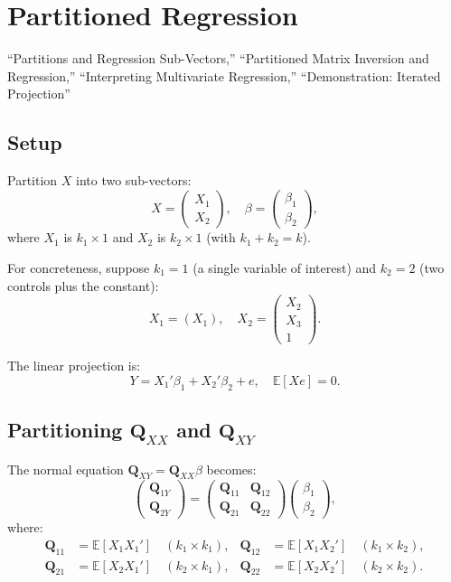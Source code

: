 \documentclass[12pt]{article}
\newcommand{\E}{\mathbb{E}}
\newcommand{\bfQ}{\mathbf{Q}}
\theoremstyle{definition}
\begin{document}
\section{Partitioned Regression}
\label{sec:partitioned}

\begin{tcolorbox}[colback=blue!5, colframe=blue!50, title=Slide Reference]
``Partitions and Regression Sub-Vectors,'' ``Partitioned Matrix Inversion and Regression,'' ``Interpreting Multivariate Regression,'' ``Demonstration: Iterated Projection''
\end{tcolorbox}

\subsection{Setup}

Partition $X$ into two sub-vectors:
\[
X = \begin{pmatrix} X_1 \\ X_2 \end{pmatrix}, \quad
\beta = \begin{pmatrix} \beta_1 \\ \beta_2 \end{pmatrix},
\]
where $X_1$ is $k_1 \times 1$ and $X_2$ is $k_2 \times 1$ (with $k_1 + k_2 = k$).

For concreteness, suppose $k_1 = 1$ (a single variable of interest) and $k_2 = 2$ (two controls plus the constant):
\[
X_1 = (X_1), \quad X_2 = \begin{pmatrix} X_2 \\ X_3 \\ 1 \end{pmatrix}.
\]

The linear projection is:
\[
Y = X_1'\beta_1 + X_2'\beta_2 + e, \quad \E[Xe] = 0.
\]

\subsection{Partitioning $\bfQ_{XX}$ and $\bfQ_{XY}$}

The normal equation $\bfQ_{XY} = \bfQ_{XX}\beta$ becomes:
\[
\begin{pmatrix} \bfQ_{1Y} \\ \bfQ_{2Y} \end{pmatrix}
=
\begin{pmatrix} \bfQ_{11} & \bfQ_{12} \\ \bfQ_{21} & \bfQ_{22} \end{pmatrix}
\begin{pmatrix} \beta_1 \\ \beta_2 \end{pmatrix},
\]
where:
\begin{align*}
\bfQ_{11} &= \E[X_1 X_1'] \quad (k_1 \times k_1), &
\bfQ_{12} &= \E[X_1 X_2'] \quad (k_1 \times k_2), \\
\bfQ_{21} &= \E[X_2 X_1'] \quad (k_2 \times k_1), &
\bfQ_{22} &= \E[X_2 X_2'] \quad (k_2 \times k_2).
\end{align*}
\end{document}
